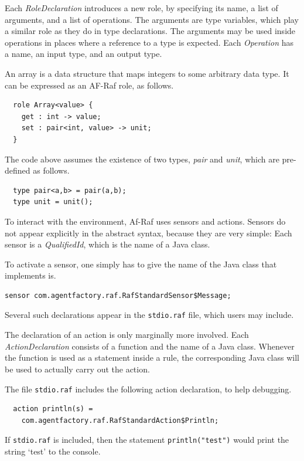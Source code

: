 \documentclass[a4paper,12pt,oneside,fleqn]{book} %
\begin{document}
{Each {\it RoleDeclaration\/} introduces a new role, by specifying its name,
a list of arguments, and a list of operations. The arguments are type
variables, which play a similar role as they do in type declarations. The
arguments may be used inside operations in places where a reference to a
type is expected. Each {\it Operation\/} has a name, an input type, and an
output type.

\begin{example}
An array is a data structure that maps integers to some arbitrary data
type. It can be expressed as an AF-Raf role, as follows.
\begin{verbatim}
  role Array<value> {
    get : int -> value;
    set : pair<int, value> -> unit;
  }
\end{verbatim}
The code above assumes the existence of two types, {\it pair\/} and {\it
unit}, which are pre-defined as follows.
\begin{verbatim}
  type pair<a,b> = pair(a,b);
  type unit = unit();
\end{verbatim}
\end{example}

To interact with the environment, Af-Raf uses sensors and actions.
Sensors do not appear explicitly in the abstract syntax, because they
are very simple: Each sensor is a {\it QualifiedId}, which is the name of a
Java class.

\begin{example}
To activate a sensor, one simply has to give the name of the Java class
that implements is.
\begin{verbatim}
sensor com.agentfactory.raf.RafStandardSensor$Message;
\end{verbatim}
Several such declarations appear in the {\tt stdio.raf} file, which users
may include.
\end{example}

The declaration of an action is only marginally more involved.  Each
{\it ActionDeclaration\/} consists of a function and the name of a Java
class. Whenever the function is used as a statement inside a rule, the
corresponding Java class will be used to actually carry out the action.

\begin{example}
The file {\tt stdio.raf} includes the following action declaration, to help
debugging.
\begin{verbatim}
  action println(s) =
    com.agentfactory.raf.RafStandardAction$Println;
\end{verbatim}
If {\tt stdio.raf} is included, then the statement {\tt println("test")}
would print the string `test' to the console.
\end{example}

}
\end{document}
